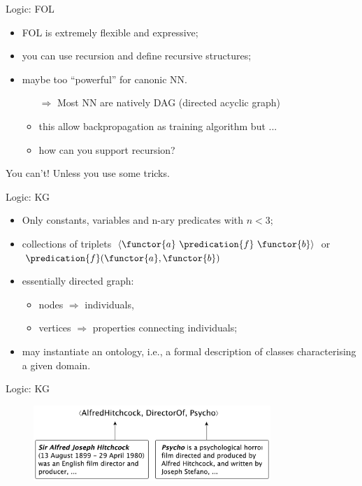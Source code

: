 \documentclass[presentation]{beamer}\mode<presentation>{\usetheme{AMSBolognaFC}}
\begin{document}
\begin{frame}[c]{Logic: FOL}
    \begin{itemize}
        \item FOL is extremely flexible and expressive;
        \item you can use recursion and define recursive structures;
        \item maybe too ``powerful'' for canonic NN.
        \begin{itemize}
            \item[$\Rightarrow$] Most NN are natively DAG (directed acyclic graph)
            \item this allow backpropagation as training algorithm but ...
            \item how can you support recursion?  
        \end{itemize}
    \end{itemize}
    \centering\vfill
    You can't!
    Unless you use some tricks.
\end{frame}

\begin{frame}[c]{Logic: KG}
    \begin{itemize}
        \item Only constants, variables and n-ary predicates with $n < 3$;
        \item collections of triplets $\langle \functor{a}\ \predication{f}\ \functor{b} \rangle$ or $\predication{f}(\functor{a}, \functor{b})$
        \item essentially directed graph:
        \begin{itemize}
            \item nodes $\Rightarrow$ individuals,
            \item vertices $\Rightarrow$ properties connecting individuals;
        \end{itemize}
        \item may instantiate an ontology, i.e., a formal description of classes characterising a given domain.
    \end{itemize}
\end{frame}

\begin{frame}[c]{Logic: KG}
    \begin{figure}
        \centering
        \includegraphics[width=0.8\textwidth]{figures/kg-example}
    \end{figure}    
\end{frame}
\end{document}
